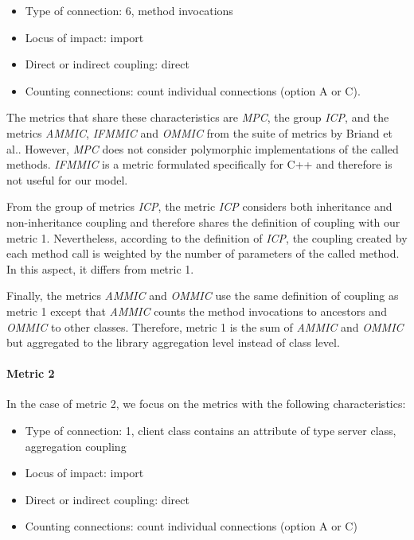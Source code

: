 \begin{itemize}
  \item Type of connection: 6, method invocations
  \item Locus of impact: import
  \item Direct or indirect coupling: direct
  \item Counting connections: count individual connections (option A or C).
\end{itemize}

The metrics that share these characteristics are \textit{MPC}, the group \textit{ICP}, and the metrics \textit{AMMIC}, \textit{IFMMIC} and \textit{OMMIC} from the suite of metrics by Briand et al.. However, \textit{MPC} does not consider polymorphic implementations of the called methods. \textit{IFMMIC} is a metric formulated specifically for C++ \cite{briand1997investigation} and therefore is not useful for our model.

From the group of metrics \textit{ICP}, the metric \textit{ICP}  considers both inheritance and non-inheritance coupling and therefore shares the definition of coupling with our metric 1. Nevertheless, according to the definition of \textit{ICP}, the coupling created by each method call is weighted by the number of parameters of the called method. In this aspect, it differs from metric 1.

Finally, the metrics \textit{AMMIC} and \textit{OMMIC} use the same definition of coupling as metric 1 except that \textit{AMMIC} counts the method invocations to ancestors and \textit{OMMIC} to other classes. Therefore, metric 1 is the sum of \textit{AMMIC} and \textit{OMMIC} but aggregated to the library aggregation level instead of class level.

\paragraph{Metric 2}
In the case of metric 2, we focus on the metrics with the following characteristics:

\begin{itemize}
  \item Type of connection: 1, client class contains an attribute of type server class, aggregation coupling
  \item Locus of impact: import
  \item Direct or indirect coupling: direct
  \item Counting connections: count individual connections (option A or C)
\end{itemize}


